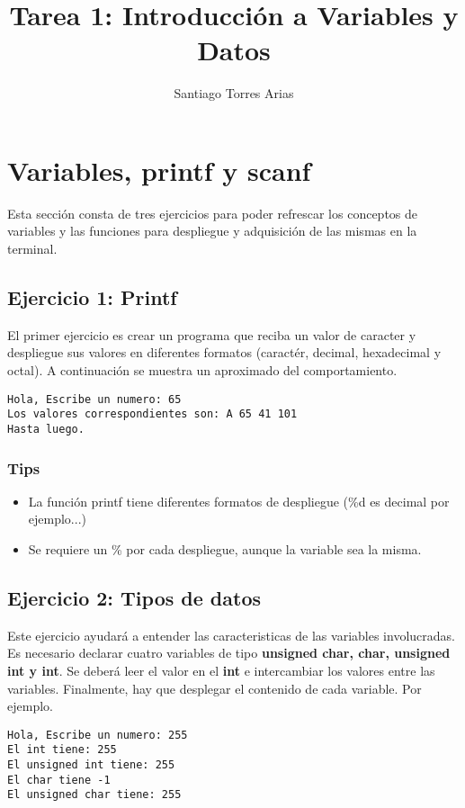 \documentclass{article}
\author{Santiago Torres Arias}
\title{Tarea 1: Introducci\'on a Variables y Datos}
\begin{document}
\maketitle
\section{Variables, printf y scanf}
Esta secci\'on consta de tres ejercicios para poder refrescar los conceptos de variables y las funciones para despliegue y adquisici\'on de las mismas en la terminal.
\subsection{Ejercicio 1: Printf}
El primer ejercicio es crear un programa que reciba un valor de caracter y despliegue sus valores en diferentes formatos (caract\'er, decimal, hexadecimal y octal). A continuaci\'on se muestra un aproximado del comportamiento.

\begin{lstlisting}[style=DOS]
Hola, Escribe un numero: 65
Los valores correspondientes son: A 65 41 101
Hasta luego.
\end{lstlisting}
\subsubsection{Tips}
\begin{itemize}
  \item La funci\'on printf tiene diferentes formatos de despliegue (\%d es decimal por ejemplo...)
  \item Se requiere un \% por cada despliegue, aunque la variable sea la misma.
\end{itemize}

\subsection{Ejercicio 2: Tipos de datos}
Este ejercicio ayudar\'a a entender las caracteristicas de las variables involucradas. Es necesario declarar cuatro variables de tipo \textbf{unsigned char, char, unsigned int y int}. Se deber\'a leer el valor en el \textbf{int} e intercambiar los valores entre las variables. Finalmente, hay que desplegar el contenido de cada variable. Por ejemplo. 

\begin{lstlisting}[style=DOS]
Hola, Escribe un numero: 255
El int tiene: 255
El unsigned int tiene: 255
El char tiene -1
El unsigned char tiene: 255
\end{lstlisting}
\end{document}
